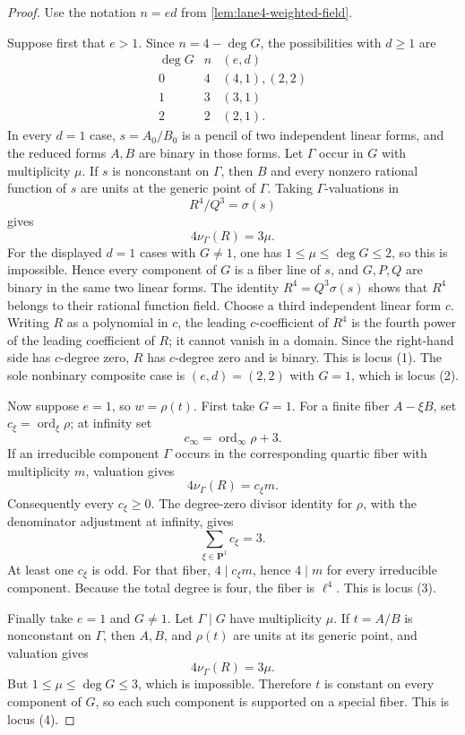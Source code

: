 \begin{proof}
Use the notation \(n=ed\) from \cref{lem:lane4-weighted-field}.

Suppose first that \(e>1\).  Since \(n=4-\deg G\), the possibilities with
\(d\geq1\) are
\[
\begin{array}{c|c|c}
\deg G&n&(e,d)\\ \hline
0&4&(4,1),(2,2)\\
1&3&(3,1)\\
2&2&(2,1).
\end{array}
\]
In every \(d=1\) case, \(s=A_0/B_0\) is a pencil of two independent linear
forms, and the reduced forms \(A,B\) are binary in those forms.  Let
\(\Gamma\) occur in \(G\) with multiplicity \(\mu\).  If \(s\) is
nonconstant on \(\Gamma\), then \(B\) and every nonzero rational function of
\(s\) are units at the generic point of \(\Gamma\).  Taking
\(\Gamma\)-valuations in
\[
 R^4/Q^3=\sigma(s)
\]
gives
\[
 4\nu_\Gamma(R)=3\mu.
\]
For the displayed \(d=1\) cases with \(G\ne1\), one has
\(1\leq\mu\leq\deg G\leq2\), so this is impossible.  Hence every component of
\(G\) is a fiber line of \(s\), and \(G,P,Q\) are binary in the same two
linear forms.  The identity \(R^4=Q^3\sigma(s)\) shows that \(R^4\) belongs
to their rational function field.  Choose a third independent linear form
\(c\).  Writing \(R\) as a polynomial in \(c\), the leading
\(c\)-coefficient of \(R^4\) is the fourth power of the leading
coefficient of \(R\); it cannot vanish in a domain.  Since the right-hand
side has \(c\)-degree zero, \(R\) has \(c\)-degree zero and is binary.  This is locus (1).  The sole nonbinary composite case is
\((e,d)=(2,2)\) with \(G=1\), which is locus (2).

Now suppose \(e=1\), so \(w=\rho(t)\).  First take \(G=1\).  For a finite
fiber \(A-\xi B\), set \(c_\xi=\operatorname{ord}_\xi\rho\); at infinity set
\[
 c_\infty=\operatorname{ord}_\infty\rho+3.
\]
If an irreducible component \(\Gamma\) occurs in the corresponding quartic
fiber with multiplicity \(m\), valuation gives
\[
 4\nu_\Gamma(R)=c_\xi m.
\]
Consequently every \(c_\xi\geq0\).  The degree-zero divisor identity for
\(\rho\), with the denominator adjustment at infinity, gives
\[
 \sum_{\xi\in\mathbf P^1}c_\xi=3.
\]
At least one \(c_\xi\) is odd.  For that fiber,
\(4\mid c_\xi m\), hence \(4\mid m\) for every irreducible component.
Because the total degree is four, the fiber is \(\ell^4\).  This is
locus (3).

Finally take \(e=1\) and \(G\ne1\).  Let \(\Gamma\mid G\) have multiplicity
\(\mu\).  If \(t=A/B\) is nonconstant on \(\Gamma\), then \(A,B\), and
\(\rho(t)\) are units at its generic point, and valuation gives
\[
 4\nu_\Gamma(R)=3\mu.
\]
But \(1\leq\mu\leq\deg G\leq3\), which is impossible.  Therefore \(t\) is
constant on every component of \(G\), so each such component is supported on
a special fiber.  This is locus (4).
\end{proof}

